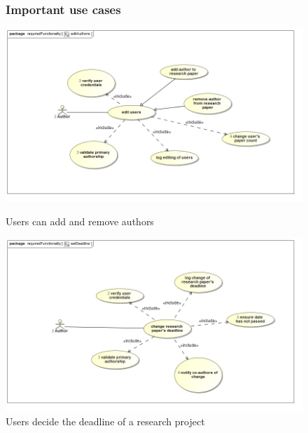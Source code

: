 \documentclass[a4paper,12pt]{report}
\begin{document}
\begin{figure}[ht]
\subsubsection{Important use cases}
\includegraphics[scale=0.5]{uc__editAuthors.jpg} 
\caption{Users can add and remove authors}


\includegraphics[scale=0.5]{uc__setDeadline.jpg} 
\caption{Users decide the deadline of a research project}
\end{figure}
\newpage
\end{document}
